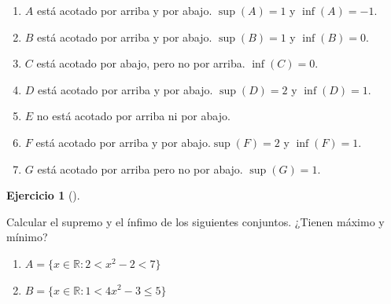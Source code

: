 \documentclass[
  a4paper,
]{scrreport}
\providecommand{\tightlist}{%
  \setlength{\itemsep}{0pt}\setlength{\parskip}{0pt}}\usepackage{longtable,booktabs,array}
\theoremstyle{definition}
\newtheorem{exercise}{Ejercicio}[chapter]
\theoremstyle{remark}
\begin{document}
\begin{tcolorbox}[enhanced jigsaw, left=2mm, arc=.35mm, coltitle=black, toprule=.15mm, colback=white, breakable, bottomrule=.15mm, colbacktitle=quarto-callout-tip-color!10!white, bottomtitle=1mm, toptitle=1mm, opacityback=0, titlerule=0mm, opacitybacktitle=0.6, title=\textcolor{quarto-callout-tip-color}{\faLightbulb}\hspace{0.5em}{Solución}, rightrule=.15mm, leftrule=.75mm, colframe=quarto-callout-tip-color-frame]

\begin{enumerate}
\def\labelenumi{\alph{enumi}.}
\item
  \(A\) está acotado por arriba y por abajo. \(\sup(A)=1\) y
  \(\inf(A)=-1\).
\item
  \(B\) está acotado por arriba y por abajo. \(\sup(B)=1\) y
  \(\inf(B)=0\).
\item
  \(C\) está acotado por abajo, pero no por arriba. \(\inf(C)=0\).
\item
  \(D\) está acotado por arriba y por abajo. \(\sup(D)=2\) y
  \(\inf(D)=1\).
\item
  \(E\) no está acotado por arriba ni por abajo.
\item
  \(F\) está acotado por arriba y por abajo.\(\sup(F)=2\) y
  \(\inf(F)=1\).
\item
  \(G\) está acotado por arriba pero no por abajo. \(\sup(G)=1\).
\end{enumerate}

\end{tcolorbox}

\leavevmode{}%
\begin{exercise}[]\label{exr-supremo-infimo-maximo-minimo-2}

Calcular el supremo y el ínfimo de los siguientes conjuntos. ¿Tienen
máximo y mínimo?

\begin{enumerate}
\def\labelenumi{\alph{enumi}.}
\tightlist
\item
  \(A=\{x\in \mathbb{R} : 2 < x^2-2 < 7\}\)
\item
  \(B=\{x\in \mathbb{R} : 1 < 4x^2 - 3 \leq 5\}\)
\end{enumerate}

\end{exercise}
\end{document}
